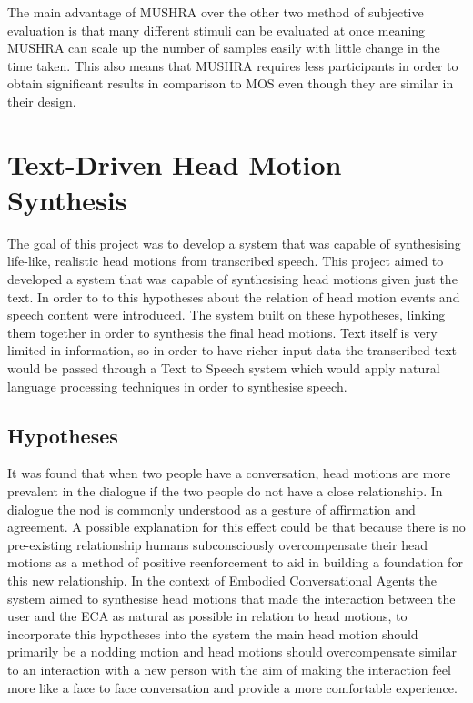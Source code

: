 \documentclass[bsc,frontabs,twoside,singlespacing,parskip]{infthesis}
\begin{document}
The main advantage of MUSHRA over the other two method of subjective evaluation is that many different stimuli can be evaluated at once meaning MUSHRA can scale up the number of samples easily with little change in the time taken. This also means that MUSHRA requires less participants in order to obtain significant results in comparison to MOS even though they are similar in their design.


\chapter{Text-Driven Head Motion Synthesis}

The goal of this project was to develop a system that was capable of synthesising life-like, realistic head motions from transcribed speech. This project aimed to developed a system that was capable of synthesising head motions given just the text. In order to to this hypotheses about the relation of head motion events and speech content were introduced. The system built on these hypotheses, linking them together in order to synthesis the final head motions. Text itself is very limited in information, so in order to have richer input data the transcribed text would be passed through a Text to Speech system which would apply natural language processing techniques in order to synthesise speech. 

\section{Hypotheses}

It was  found that when two people have a conversation, head motions are more prevalent in the dialogue if the two people do not have a close relationship. \cite{first_paper} In dialogue the nod is commonly understood as a gesture of affirmation and agreement. A possible explanation for this effect could be that because there is no pre-existing relationship humans subconsciously overcompensate their head motions as a method of positive reenforcement to aid in building a foundation for this new relationship. In the context of Embodied Conversational Agents the system aimed to synthesise head motions that made the interaction between the user and the ECA as natural as possible in relation to head motions, to incorporate this hypotheses into the system the main head motion should primarily be a nodding motion and head motions should overcompensate similar to an interaction with a new person with the aim of making the interaction feel more like a face to face conversation and provide a  more comfortable experience.
\end{document}
